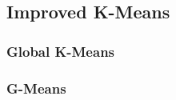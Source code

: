 \subsection{Improved K-Means}
\label{subsec:improvedkmeansresults}



\subsubsection{Global K-Means}
\label{subsec:globalkmeansresults}


\subsubsection{G-Means}
\label{subsec:gmeansresults}


